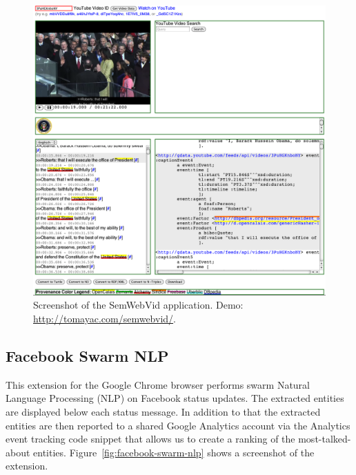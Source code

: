\documentclass[12pt]{article}
\begin{document}
\begin{figure}[htbp!]
\begin{center}
    \includegraphics[width=1\textwidth]{./resources/semwebvid.png}
    \caption[Screenshot of the SemWebVid application.]{Screenshot of the SemWebVid application. Demo: \url{http://tomayac.com/semwebvid/}.}    
  \label{fig:semwebvid}
  \end{center}  
\end{figure}

\subsection{Facebook Swarm NLP}\label{fb-swarm}
This extension for the Google Chrome browser performs swarm Natural Language Processing (NLP) on Facebook status updates. The extracted entities are displayed below each status message. In addition to that the extracted entities are then reported to a shared Google Analytics account via the Analytics event tracking code snippet that allows us to create a ranking of the most-talked-about entities. Figure~\ref{fig:facebook-swarm-nlp} shows a screenshot of the extension.
\end{document}
